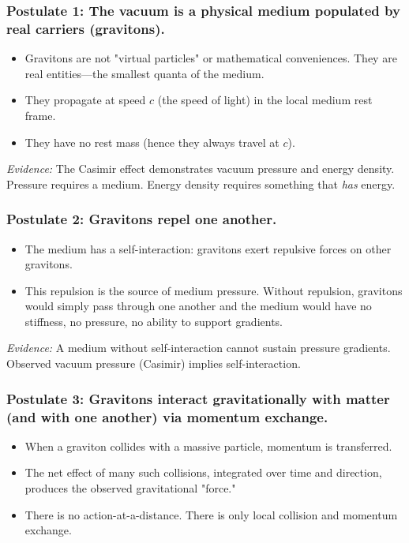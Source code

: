 \documentclass[12pt, a4paper]{article}
\begin{document}
\subsubsection{Postulate 1: The vacuum is a physical medium populated by real carriers (gravitons).}

\begin{itemize}
    \item Gravitons are not "virtual particles" or mathematical conveniences. They are real entities—the smallest quanta of the medium.
    \item They propagate at speed \(c\) (the speed of light) in the local medium rest frame.
    \item They have no rest mass (hence they always travel at \(c\)).
\end{itemize}

\textit{Evidence:} The Casimir effect demonstrates vacuum pressure and energy density. Pressure requires a medium. Energy density requires something that \textit{has} energy.

\subsubsection{Postulate 2: Gravitons repel one another.}

\begin{itemize}
    \item The medium has a self-interaction: gravitons exert repulsive forces on other gravitons.
    \item This repulsion is the source of medium pressure. Without repulsion, gravitons would simply pass through one another and the medium would have no stiffness, no pressure, no ability to support gradients.
\end{itemize}

\textit{Evidence:} A medium without self-interaction cannot sustain pressure gradients. Observed vacuum pressure (Casimir) implies self-interaction.

\subsubsection{Postulate 3: Gravitons interact gravitationally with matter (and with one another) via momentum exchange.}

\begin{itemize}
    \item When a graviton collides with a massive particle, momentum is transferred.
    \item The net effect of many such collisions, integrated over time and direction, produces the observed gravitational "force."
    \item There is no action-at-a-distance. There is only local collision and momentum exchange.
\end{itemize}
\end{document}
